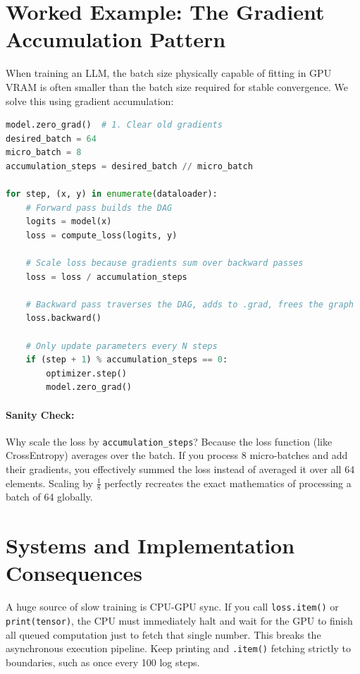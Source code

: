 \section{Worked Example: The Gradient Accumulation Pattern}
\label{ch:03:sec:example}

When training an LLM, the batch size physically capable of fitting in GPU VRAM is often smaller than the batch size required for stable convergence. We solve this using gradient accumulation:

\begin{lstlisting}[language=Python, title=Gradient Accumulation]
model.zero_grad()  # 1. Clear old gradients
desired_batch = 64
micro_batch = 8
accumulation_steps = desired_batch // micro_batch

for step, (x, y) in enumerate(dataloader):
    # Forward pass builds the DAG
    logits = model(x)
    loss = compute_loss(logits, y)
    
    # Scale loss because gradients sum over backward passes
    loss = loss / accumulation_steps
    
    # Backward pass traverses the DAG, adds to .grad, frees the graph
    loss.backward()
    
    # Only update parameters every N steps
    if (step + 1) % accumulation_steps == 0:
        optimizer.step()
        model.zero_grad()
\end{lstlisting}

\paragraph{Sanity Check:} Why scale the loss by \texttt{accumulation\_steps}? Because the loss function (like CrossEntropy) averages over the batch. If you process 8 micro-batches and add their gradients, you effectively summed the loss instead of averaged it over all 64 elements. Scaling by $\frac{1}{8}$ perfectly recreates the exact mathematics of processing a batch of 64 globally.

\section{Systems and Implementation Consequences}
\label{ch:03:sec:systems}

A huge source of slow training is CPU-GPU sync.
If you call \texttt{loss.item()} or \texttt{print(tensor)}, the CPU must immediately halt and wait for the GPU to finish all queued computation just to fetch that single number. This breaks the asynchronous execution pipeline. Keep printing and \texttt{.item()} fetching strictly to boundaries, such as once every 100 log steps.

